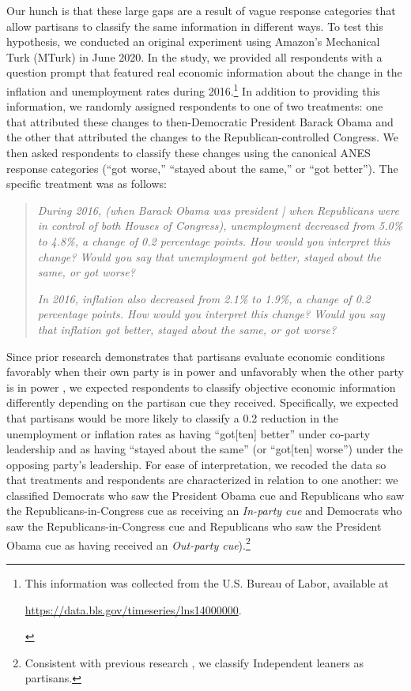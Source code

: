 \documentclass[12pt, letterpaper]{article}
\begin{document}


Our hunch is that these large gaps are a result of vague response categories that allow partisans to classify the same information in different ways. To test this hypothesis, we conducted an original experiment using Amazon's Mechanical Turk (MTurk) in June 2020. In the study, we provided all respondents with a question prompt that featured real economic information about the change in the inflation and unemployment rates during 2016.\footnote{This information was collected from the U.S. Bureau of Labor, available at \begin{footnotesize} \url{https://data.bls.gov/timeseries/lns14000000}.\end{footnotesize}} In addition to providing this information, we randomly assigned respondents to one of two treatments: one that attributed these changes to then-Democratic President Barack Obama and the other that attributed the changes to the Republican-controlled Congress. We then asked respondents to classify these changes using the canonical ANES response categories (``got worse,'' ``stayed about the same,'' or ``got better''). The specific treatment was as follows: 

\begin{quotation} 
\noindent \textit{During 2016, (when Barack Obama was president | when Republicans were in control of both Houses of Congress), unemployment decreased from 5.0\% to 4.8\%, a change of 0.2 percentage points. How would you interpret this change? Would you say that unemployment got better, stayed about the same, or got worse?}

\bigskip

\noindent \textit{In 2016, inflation also decreased from 2.1\% to 1.9\%, a change of 0.2 percentage points. How would you interpret this change? Would you say that inflation got better, stayed about the same, or got worse?}

\end{quotation}

Since prior research demonstrates that partisans evaluate economic conditions favorably when their own party is in power and unfavorably when the other party is in power \citep[e.g.][]{bartels_2002,bisgaard2015bias}, we expected respondents to classify objective economic information differently depending on the partisan cue they received. Specifically, we expected that partisans would be more likely to classify a 0.2 reduction in the unemployment or inflation rates as having ``got[ten] better'' under co-party leadership and as having ``stayed about the same'' (or ``got[ten] worse'') under the opposing party's leadership. For ease of interpretation, we recoded the data so that treatments and respondents are characterized in relation to one another: we classified Democrats who saw the President Obama cue and Republicans who saw the Republicans-in-Congress cue as receiving an \textit{In-party cue} and Democrats who saw the Republicans-in-Congress cue and Republicans who saw the President Obama cue as having received an \textit{Out-party cue}).\footnote{Consistent with previous research \citep[e.g.,][]{keithetal_1992}, we classify Independent leaners as partisans.} 
\end{document}
